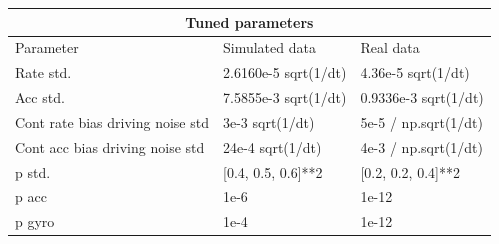 \begin{tabular}{ |p{5.5cm}||p{4cm}|p{4cm}|  }
	\hline
	\multicolumn{3}{|c|}{Tuned parameters} \\
	\hline
	Parameter & Simulated data & Real data\\
	\hline
	Rate std.			& 2.6160e-5 sqrt(1/dt)	&   4.36e-5 sqrt(1/dt)\\
	Acc std.			& 7.5855e-3	sqrt(1/dt)  &	0.9336e-3 sqrt(1/dt)\\
	Cont rate bias driving noise std	& 3e-3 sqrt(1/dt)	& 5e-5 / np.sqrt(1/dt)\\	
	Cont acc bias driving noise std		& 24e-4 sqrt(1/dt)	& 4e-3 / np.sqrt(1/dt)\\
	p std.							& [0.4, 0.5, 0.6]**2 	& [0.2, 0.2, 0.4]**2\\
	p acc							& 1e-6 		& 1e-12\\
	p gyro 							& 1e-4 		& 1e-12\\
	\hline
\end{tabular}

